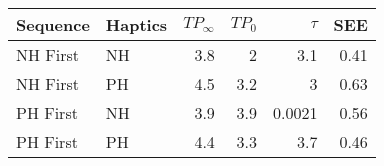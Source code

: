 \begin{tabular}{llrrrr}
\toprule
 Sequence & Haptics &  ${TP}_{\infty}$ &  ${TP}_0$ &  $\tau$ &  SEE \\
\midrule
 NH First &  NH & 3.8 & 2 & 3.1 & 0.41 \\
 NH First &  PH & 4.5 & 3.2 & 3 & 0.63 \\
 PH First &  NH & 3.9 & 3.9 & 0.0021 & 0.56 \\
 PH First &  PH & 4.4 & 3.3 & 3.7 & 0.46 \\
\bottomrule
\end{tabular}
